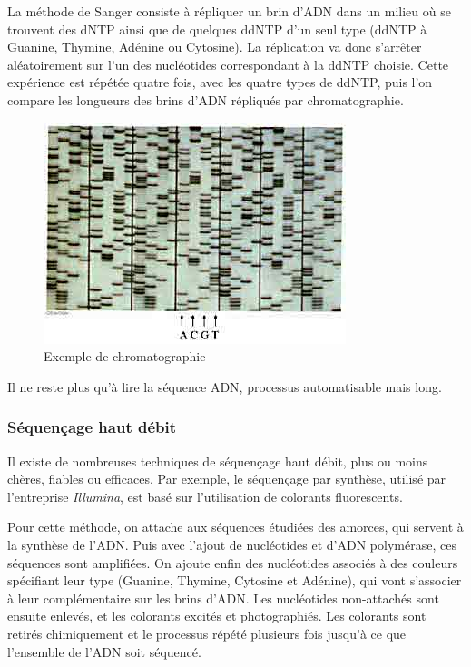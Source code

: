 La méthode de Sanger consiste à répliquer un brin d'ADN dans un milieu où se trouvent des dNTP ainsi que de quelques ddNTP d'un seul type (ddNTP à Guanine, Thymine, Adénine ou Cytosine). La réplication va donc s’arrêter aléatoirement sur l'un des nucléotides correspondant à la ddNTP choisie. Cette expérience est répétée quatre fois, avec les quatre types de ddNTP, puis l'on compare les longueurs des brins d'ADN répliqués par chromatographie.


\begin{figure}[!ht]
    \center
    \includegraphics[]{./images/chromato_acanthoweb.jpg}
    \caption{Exemple de chromatographie}
    \label{chromato}
\end{figure}


Il ne reste plus qu'à lire la séquence ADN, processus automatisable mais long.

\subsubsection{Séquençage haut débit}
Il existe de nombreuses techniques de séquençage haut débit, plus ou moins chères, fiables ou efficaces.
Par exemple, le séquençage par synthèse, utilisé par l'entreprise \emph{Illumina}, est basé sur l'utilisation de colorants fluorescents.

Pour cette méthode, on attache aux séquences étudiées des amorces, qui servent à la synthèse de l'ADN. Puis avec l'ajout de nucléotides et d'ADN polymérase, ces séquences sont amplifiées. On ajoute enfin des nucléotides associés à des couleurs spécifiant leur type (Guanine, Thymine, Cytosine et Adénine), qui vont s'associer à leur complémentaire sur les brins d'ADN. Les nucléotides non-attachés sont ensuite enlevés, et les colorants excités et photographiés. Les colorants sont retirés chimiquement et le processus répété plusieurs fois jusqu'à ce que l'ensemble de l'ADN soit séquencé.

